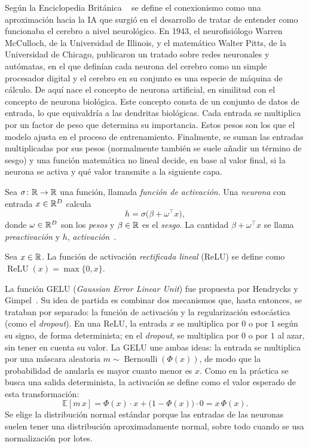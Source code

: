 Según la Enciclopedia Británica ~\cite{copeland_connectionism} se define el conexionismo como una aproximación hacia la IA que surgió
en el desarrollo de tratar de entender como funcionaba el cerebro a nivel neurológico. En 1943, el neurofisiólogo Warren McCulloch, de la Universidad de Illinois, y el matemático Walter Pitts, de la Universidad de Chicago,
publicaron un tratado sobre redes neuronales y autómatas, en el que definían cada neurona del cerebro como un simple
procesador digital y  el cerebro en su conjunto es una especie de máquina de cálculo. De aquí nace el concepto de 
neurona artificial, en similitud con el concepto de neurona biológica. Este concepto consta de un conjunto de datos de entrada,
lo que equivaldría a las dendritas biológicas. Cada entrada se multiplica por un factor de peso
que determina su importancia. Estos pesos son los que el modelo ajusta en el proceso de entrenamiento. Finalmente, se suman las entradas
multiplicadas por sus pesos (normalmente también se suele añadir un término de sesgo) y una función matemática no lineal decide, en base
al valor final, si la neurona se activa y qué valor transmite a la siguiente capa.

\begin{definicion}\label{def:neurona}
Sea $\sigma\colon\mathbb{R}\to\mathbb{R}$ una función, llamada \emph{función de activación}. Una
\emph{neurona} con entrada $x\in\mathbb{R}^{D}$ calcula
\[
  h = \sigma\bigl(\beta + \omega^{\top}x\bigr),
\]
donde $\omega\in\mathbb{R}^{D}$ son los \emph{pesos} y $\beta\in\mathbb{R}$ es el \emph{sesgo}. La
cantidad $\beta + \omega^{\top}x$ se llama \emph{preactivación} y $h$,
\emph{activación}~\cite[cap.~3]{prince2023understanding}.
\end{definicion}

\begin{definicion}[ReLU]\label{def:relu}
Sea $x\in\mathbb{R}$. La función de activación \emph{rectificada lineal} (ReLU) se define como $\operatorname{ReLU}(x) = \max\{0,x\}$.
\end{definicion}

La función GELU (\emph{Gaussian Error Linear Unit}) fue propuesta por Hendrycks y Gimpel~\cite{hendrycks2016gelu}. Su idea de partida es combinar dos mecanismos que, hasta entonces, se trataban por separado: la función de activación y la regularización estocástica (como el \emph{dropout}). En una ReLU, la entrada $x$ se multiplica por $0$ o por $1$ según su signo, de forma determinista; en el \emph{dropout}, se multiplica por $0$ o por $1$ al azar, sin tener en cuenta su valor. La GELU une ambas ideas: la entrada se multiplica por una máscara aleatoria $m \sim \operatorname{Bernoulli}(\Phi(x))$, de modo que la probabilidad de anularla es mayor cuanto menor es $x$. Como en la práctica se busca una salida determinista, la activación se define como el valor esperado de esta transformación:
\[
  \mathbb{E}[m\,x] = \Phi(x)\cdot x + \bigl(1-\Phi(x)\bigr)\cdot 0 = x\,\Phi(x).
\]
Se elige la distribución normal estándar porque las entradas de las neuronas suelen tener una distribución aproximadamente normal, sobre todo cuando se usa normalización por lotes.

